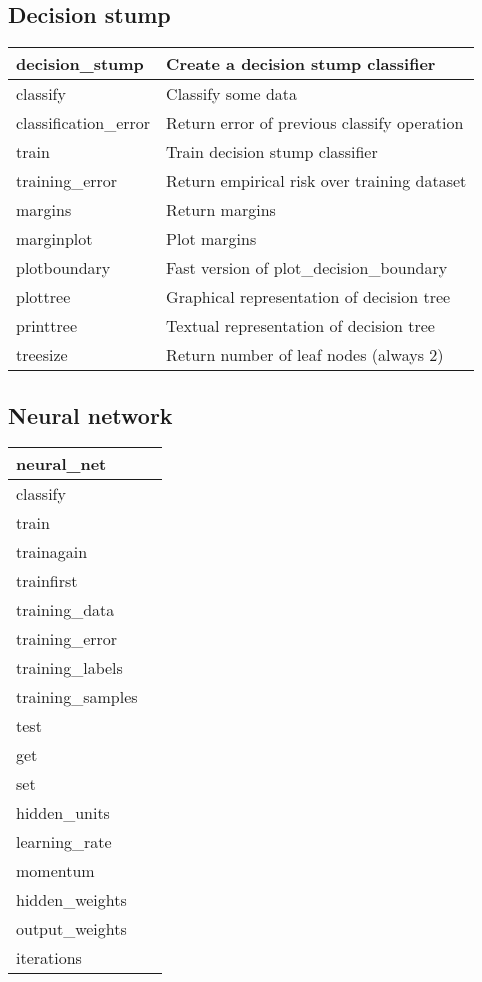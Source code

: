 \subsection{Decision stump}

\begin{tabular}{ll}
\hline
decision\_stump		& Create a decision stump classifier \\
\hline
classify		& Classify some data \\
classification\_error	& Return error of previous classify operation \\
\hline
train			& Train decision stump classifier \\
training\_error		& Return empirical risk over training dataset \\
\hline
margins			& Return margins \\
marginplot		& Plot margins \\
\hline
plotboundary		& Fast version of plot\_decision\_boundary \\
plottree		& Graphical representation of decision tree \\
printtree		& Textual representation of decision tree \\
treesize		& Return number of leaf nodes (always 2) \\
\hline
\end{tabular}

\subsection{Neural network}

\begin{tabular}{ll}
\hline
neural\_net		& \\
\hline
classify		& \\
\hline
train			& \\
trainagain		& \\
trainfirst		& \\
training\_data		& \\
training\_error		& \\
training\_labels	& \\
training\_samples	& \\
\hline
test			& \\
\hline
get			& \\
set			& \\
\hline
hidden\_units		& \\
learning\_rate		& \\
momentum		& \\
\hline
hidden\_weights		& \\
output\_weights		& \\
iterations		& \\
\hline
\end{tabular}

